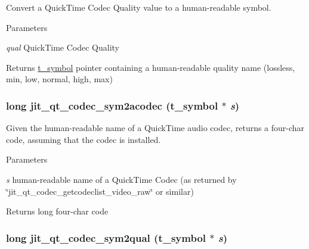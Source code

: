 Convert a QuickTime Codec Quality value to a human-\/readable symbol. 
\begin{DoxyParams}{Parameters}
\item[{\em qual}]QuickTime Codec Quality\end{DoxyParams}
\begin{DoxyReturn}{Returns}
\hyperlink{structt__symbol}{t\_\-symbol} pointer containing a human-\/readable quality name (lossless, min, low, normal, high, max) 
\end{DoxyReturn}
\hypertarget{group__qtcodecmod_gadfc23f47d2ad5a71faa07c5e65addff9}{
\subsubsection[{jit\_\-qt\_\-codec\_\-sym2acodec}]{\setlength{\rightskip}{0pt plus 5cm}long jit\_\-qt\_\-codec\_\-sym2acodec ({\bf t\_\-symbol} $\ast$ {\em s})}}
\label{group__qtcodecmod_gadfc23f47d2ad5a71faa07c5e65addff9}


Given the human-\/readable name of a QuickTime audio codec, returns a four-\/char code, assuming that the codec is installed. 
\begin{DoxyParams}{Parameters}
\item[{\em s}]human-\/readable name of a QuickTime Codec (as returned by \char`\"{}jit\_\-qt\_\-codec\_\-getcodeclist\_\-video\_\-raw\char`\"{} or similar)\end{DoxyParams}
\begin{DoxyReturn}{Returns}
long four-\/char code 
\end{DoxyReturn}
\hypertarget{group__qtcodecmod_ga051fcec661fa05ec19ef6c3949413c18}{
\subsubsection[{jit\_\-qt\_\-codec\_\-sym2qual}]{\setlength{\rightskip}{0pt plus 5cm}long jit\_\-qt\_\-codec\_\-sym2qual ({\bf t\_\-symbol} $\ast$ {\em s})}}
\label{group__qtcodecmod_ga051fcec661fa05ec19ef6c3949413c18}



